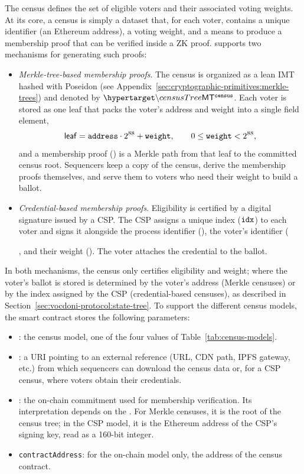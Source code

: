 
The census defines the set of eligible voters and their associated voting weights. At its core, a census is simply a dataset that, for each voter, contains a unique identifier (an Ethereum address), a voting weight, and a means to produce a membership proof that can be verified inside a \ac{ZK} proof. \Davinci supports two mechanisms for generating such proofs:
\begin{itemize}
	\item \textit{Merkle-tree-based membership proofs}. The census is organized as a lean \ac{IMT} hashed with Poseidon (see Appendix~\ref{sec:cryptographic-primitives:merkle-trees}) and denoted by $\hlset{\censusTree}$. Each voter is stored as one leaf that packs the voter's address and weight into a single field element,
	\begin{equation}
		{\sf leaf} = \texttt{address} \cdot 2^{88} + \texttt{weight}, \qquad 0 \le \texttt{weight} < 2^{88},
		\label{eq:census-leaf}
	\end{equation}
	and a membership proof (\censuspf) is a Merkle path from that leaf to the committed census root. Sequencers keep a copy of the census, derive the membership proofs themselves, and serve them to voters who need their weight to build a ballot.
	\item \textit{Credential-based membership proofs}. Eligibility is certified by a digital signature issued by a \ac{CSP}. The \ac{CSP} assigns a unique index ($\texttt{idx}$) to each voter and signs it alongside the process identifier (\processid), the voter's identifier (\address), and their weight (\weight). The voter attaches the credential to the ballot.
\end{itemize}
%
In both mechanisms, the census only certifies eligibility and weight; where the voter's ballot is stored is determined by the voter's address (Merkle censuses) or by the index assigned by the \ac{CSP} (credential-based censuses), as described in Section~\ref{sec:vocdoni-protocol:state-tree}.
To support the different census models, the \hlget{\processregistry} smart contract stores the following parameters:
\begin{itemize}
	\item \censusorigin: the census model, one of the four values of Table~\ref{tab:census-models}.
	\item \censusuri: a \ac{URI} pointing to an external reference (URL, CDN path, IPFS gateway, etc.) from which sequencers can download the census data or, for a \ac{CSP} census, where voters obtain their credentials.
	\item \censusroot: the on-chain commitment used for membership verification. Its interpretation depends on the \censusorigin. For Merkle censuses, it is the root of the census tree; in the \ac{CSP} model, it is the Ethereum address of the \ac{CSP}'s signing key, read as a 160-bit integer.
	\item \texttt{contractAddress}: for the on-chain model only, the address of the census contract.
\end{itemize}
